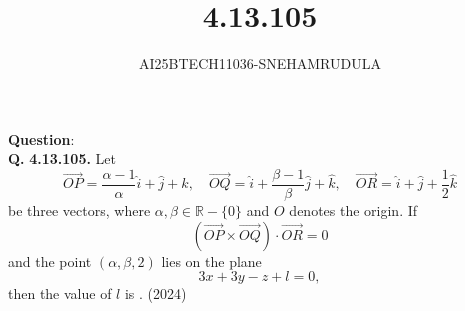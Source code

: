 \documentclass[journal]{IEEEtran}
\begin{document}

\vspace{3cm}

\title{4.13.105}
\author{AI25BTECH11036-SNEHAMRUDULA}
 \maketitle
{\let\newpage\relax\maketitle}
\renewcommand{\thefigure}{\theenumi}
\renewcommand{\thetable}{\theenumi}
\setlength{\intextsep}{10pt} 
\renewcommand{\thetable}{\theenumi}
\textbf{Question}:\\
\textbf{Q.}\;
\noindent\textbf{4.13.105.}  
Let 
\[
\overrightarrow{OP}=\frac{\alpha-1}{\alpha}\hat{i}+\hat{j}+\hat{k}, \quad
\overrightarrow{OQ}=\hat{i}+\frac{\beta-1}{\beta}\hat{j}+\hat{k}, \quad
\overrightarrow{OR}=\hat{i}+\hat{j}+\frac{1}{2}\hat{k}
\]
be three vectors, where $\alpha,\beta \in \mathbb{R}-\{0\}$ and $O$ denotes the origin.  
If 
\[
\left(\overrightarrow{OP}\times\overrightarrow{OQ}\right)\cdot\overrightarrow{OR}=0
\]
and the point $(\alpha,\beta,2)$ lies on the plane
\[
3x+3y-z+l=0,
\]
then the value of $l$ is \underline{\hspace{2cm}}. \hfill (2024)
\solution\\
\end{document}
